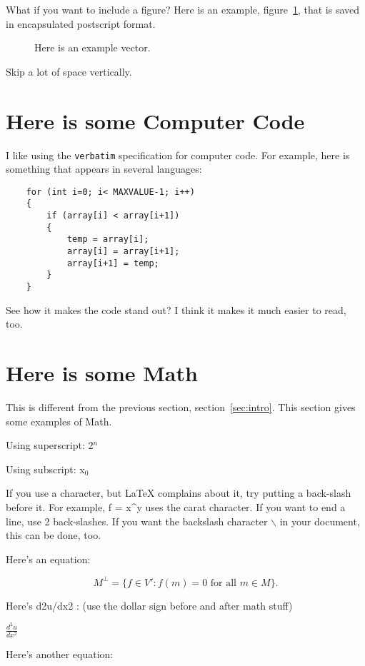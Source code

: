 \documentclass[final]{ieee}
\begin{document}
What if you want to include a figure?
Here is an example, figure~\ref{fig:phasor1}, that is saved in
encapsulated postscript format.

\begin{figure}[!hbt]
  \centering
  \caption{Here is an example vector.}
  \label{fig:phasor1}
\end{figure}


Skip a lot of space  \bigskip  vertically.

\section{Here is some Computer Code}\label{sec:code}

I like using the \verb"verbatim" specification for computer code.
For example, here is something that appears in several
languages:

\begin{verbatim}
    for (int i=0; i< MAXVALUE-1; i++)
    {
        if (array[i] < array[i+1])
        {
            temp = array[i];
            array[i] = array[i+1];
            array[i+1] = temp;
        }
    }
\end{verbatim}

See how it makes the code stand out? I think it makes it
much easier to read, too.

\section{Here is some Math}\label{sec:math}
This is different from the previous section, section~\ref{sec:intro}.
This section gives some examples of Math.

Using superscript:  2$^{n}$

Using subscript: x$_{0}$

If you use a character, but LaTeX complains about it, try putting a
back-slash before it. For example,
f = x\^{}y  uses the carat character.
If you want to end a line, use 2 back-slashes.
If you want the backslash character $\backslash$ in your document,
this can be done, too.

Here's an equation:

\[ M^\bot = \{ f \in V' : f(m) = 0 \mbox{ for all } m \in M \}.\]

Here's d2u/dx2 : (use the dollar sign before and after math stuff)

$ \frac{d^2 u}{dx^2} $

Here's another equation:
\end{document}

